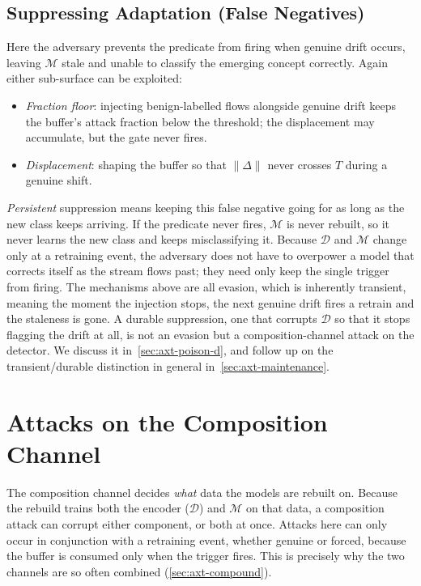 \subsection{Suppressing Adaptation (False Negatives)}
\label{sec:axt-suppress}
Here the adversary prevents the predicate from firing when genuine drift occurs, leaving $\mathcal{M}$ stale and unable to classify the emerging concept correctly. Again either sub-surface can be exploited:
\begin{itemize}
    \item \textit{Fraction floor}: injecting benign-labelled flows alongside genuine drift keeps the buffer's attack fraction below the threshold; the displacement may accumulate, but the gate never fires.
    \item \textit{Displacement}: shaping the buffer so that $\| \Delta \|$ never crosses $T$ during a genuine shift.
\end{itemize}

\emph{Persistent} suppression means keeping this false negative going for as long as the new class keeps arriving. If the predicate never fires, $\mathcal{M}$ is never rebuilt, so it never learns the new class and keeps misclassifying it. Because $\mathcal{D}$ and $\mathcal{M}$ change only at a retraining event, the adversary does not have to overpower a model that corrects itself as the stream flows past; they need only keep the single trigger from firing. The mechanisms above are all evasion, which is inherently transient, meaning the moment the injection stops, the next genuine drift fires a retrain and the staleness is gone. A durable suppression, one that corrupts $\mathcal{D}$ so that it stops flagging the drift at all, is not an evasion but a composition-channel attack on the detector. We discuss it in~\cref{sec:axt-poison-d}, and follow up on the transient/durable distinction in general in~\cref{sec:axt-maintenance}.


\section{Attacks on the Composition Channel}
\label{sec:axt-composition}
The composition channel decides \emph{what} data the models are rebuilt on. Because the rebuild trains both the encoder ($\mathcal{D}$) and $\mathcal{M}$ on that data, a composition attack can corrupt either component, or both at once. Attacks here can only occur in conjunction with a retraining event, whether genuine or forced, because the buffer is consumed only when the trigger fires. This is precisely why the two channels are so often combined (\cref{sec:axt-compound}).

